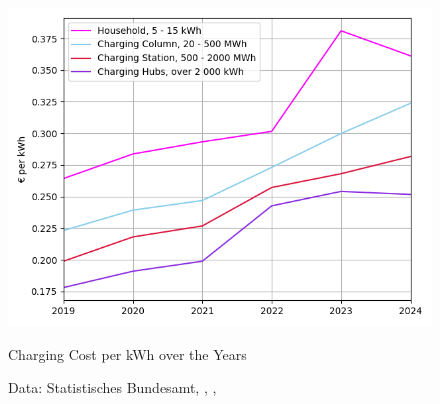 \begin{figure}[H]
	\begin{center}
		\includegraphics[width=\linewidth]{images/Elec_price.png}
	\caption{Charging Cost per kWh over the Years}
	\label{fig: electr_bill}
	\caption*{Data: Statistisches Bundesamt, \cite{DestatisStrompreise}, \cite{GENESISHaushalt}, \cite{GENESISNichtHaushalt}}
	\end{center}
\end{figure}

